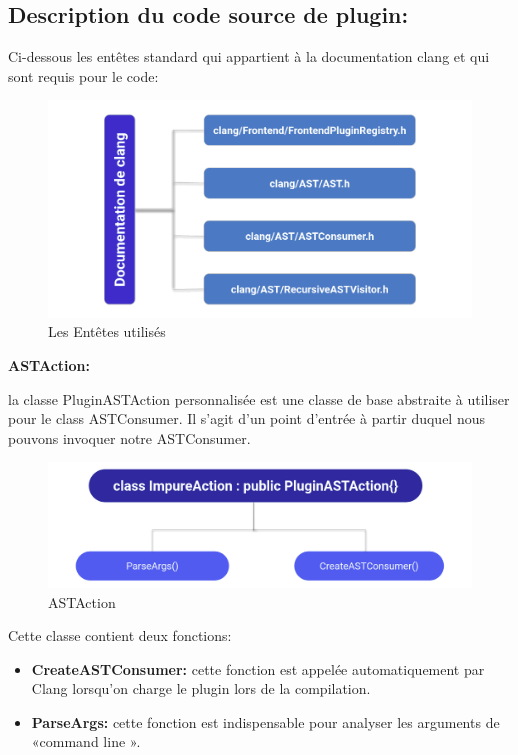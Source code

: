 \documentclass[12pt,a4paper]{article}
\begin{document}
\subsection{Description du code source de plugin:} 

Ci-dessous les entêtes standard qui appartient à la documentation clang et qui sont requis pour le code: 

\begin{figure}[H]
\centering
\includegraphics[scale=0.5]{headerss.png} 
\caption[Les Entêtes]{Les Entêtes utilisés} 
\end{figure}


\textbf{ASTAction:}

la classe PluginASTAction personnalisée est une classe de base abstraite à utiliser pour  le class ASTConsumer. Il s’agit d’un point d'entrée à partir duquel nous pouvons invoquer notre ASTConsumer.\\
\begin{figure}[H]
\centering
\includegraphics[scale=0.75]{action-1.png} 
\caption[ASTAction]{ASTAction} 
\end{figure}

Cette classe contient deux fonctions:

\begin{itemize}
    \item \textbf{CreateASTConsumer:} cette fonction est appelée automatiquement par Clang  lorsqu'on charge le plugin lors de la compilation.
	\item \textbf{ ParseArgs:} cette fonction est indispensable pour analyser les arguments de «command line ».
\end{itemize}
\end{document}
